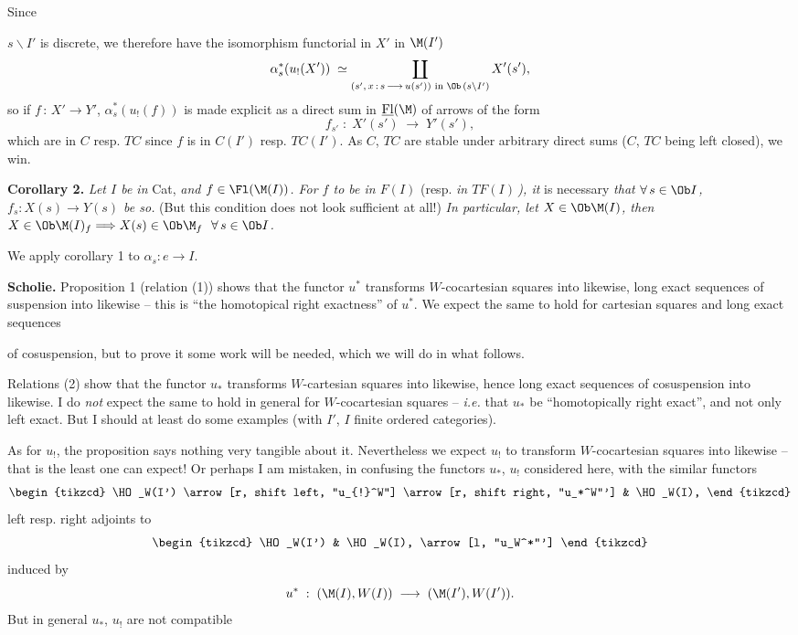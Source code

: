 Since

\noindent{}

\noindent $s\backslash I'$ is discrete, we therefore have the isomorphism functorial in $X'$ in $\M(I')$
\[
\alpha_s^*(u_{!}(X')) \;\simeq \coprod_{(s',\, x \,:\, s \,\longrightarrow\, u(s')) \text{ in } \Ob\,(s\backslash I')} X'(s'),
\]
so if $f \,:\, X' \longrightarrow Y'$, $\alpha_s^*(u_{!}(f))$ is made explicit as a direct sum in $\underline{\mathrm{Fl}}(\M)$ of arrows of the form
\[
f_{s'} \;:\; X'(s') \;\longrightarrow\; Y'(s'),
\]
which are in $C$ resp. $TC$ since $f$ is in $C(I')$ resp. $TC(I')$. As $C$, $TC$ are stable under arbitrary direct sums ($C$, $TC$ being left closed), we win.

\textbf{Corollary 2.} \textit{Let $I$ be in} Cat, \textit{and $f \in \Fl(\M(I))$. For $f$ to be in $F(I)$} (resp. \textit{in $TF(I)$\,), it} is necessary \textit{that $\forall\, s \in \Ob I$, $f_s : X(s) \longrightarrow Y(s)$ be so.} (But this condition does not look sufficient at all!) \textit{In particular, let $X \in \Ob\M(I)$, then $X \in \Ob\M(I)_f \Longrightarrow X(s) \in \Ob\M_f \ \ \forall\, s \in \Ob I$.}

We apply corollary 1 to $\alpha_s : e \longrightarrow I$.

\textbf{Scholie.} Proposition 1 (relation (1)) shows that the functor $u^*$ transforms $W$-cocartesian squares into likewise, long exact sequences of suspension into likewise – this is ``the homotopical right exactness'' of $u^*$. We expect the same to hold for cartesian squares and long exact sequences

\noindent{}

\noindent of cosuspension, but to prove it some work will be needed, which we will do in what follows.

Relations (2) show that the functor $u_*$ transforms $W$-cartesian squares into likewise, hence long exact sequences of cosuspension into likewise. I do \textit{not} expect the same to hold in general for $W$-cocartesian squares – \textit{i.e.} that $u_*$ be ``homotopically right exact'', and not only left exact. But I should at least do some examples (with $I'$, $I$ finite ordered categories).

As for $u_{!}$, the proposition says nothing very tangible about it. Nevertheless we expect $u_{!}$ to transform $W$-cocartesian squares into likewise – that is the least one can expect! Or perhaps I am mistaken, in confusing the functors $u_*$, $u_{!}$ considered here, with the similar functors
\[
\begin{tikzcd}
\HO_W(I') \arrow[r, shift left, "u_{!}^W"] \arrow[r, shift right, "u_*^W"'] & \HO_W(I),
\end{tikzcd}
\]
left resp. right adjoints to
\[
\begin{tikzcd}
\HO_W(I') & \HO_W(I), \arrow[l, "u_W^*"']
\end{tikzcd}
\]
induced by
\[
u^* \;:\; (\M(I),W(I)) \;\longrightarrow\; (\M(I'),W(I')).
\]
But in general $u_*$, $u_{!}$ are not compatible

